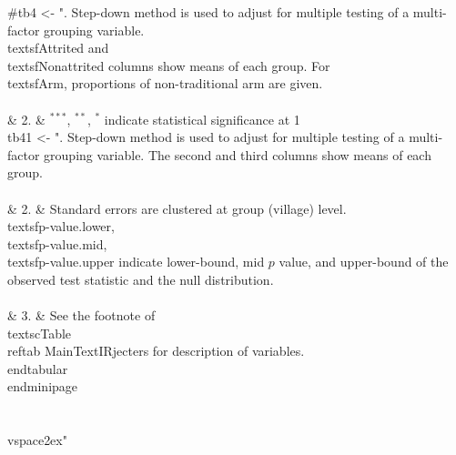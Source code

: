 \begin{Schunk}
\begin{Sinput}
#tb4 <- ". Step-down method is used to adjust for multiple testing of a multi-factor grouping variable. \\textsf{Attrited} and \\textsf{Nonattrited} columns show means of each group. For \\textsf{Arm}, proportions of non-traditional arm are given. \\\\& 2. & ${}^{***}$, ${}^{**}$, ${}^{*}$ indicate statistical significance at 1\\%, 5\\%, 10\\%, respetively. Standard errors are clustered at group (village) level.  \\\\& 3. & See the footnote of \\textsc{Table \\ref{tab MainTextIRjecters}} for description of variables. \\end{tabular}\\end{minipage}\\\\\\vspace{2ex}"
tb41 <- ". Step-down method is used to adjust for multiple testing of a multi-factor grouping variable. The second and third columns show means of each group. \\\\& 2. & Standard errors are clustered at group (village) level. \\textsf{p-value.lower}, \\textsf{p-value.mid}, \\textsf{p-value.upper} indicate lower-bound, mid $p$ value, and upper-bound of the observed test statistic and the null distribution.  \\\\& 3. & See the footnote of \\textsc{Table \\ref{tab MainTextIRjecters}} for description of variables. \\end{tabular}\\end{minipage}\\\\\\vspace{2ex}"

\end{Sinput}
\end{Schunk}
